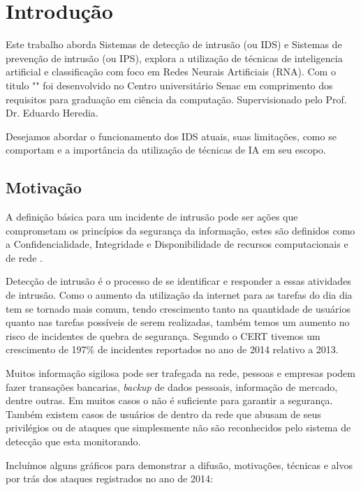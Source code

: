 
\chapter[Introdução]{Introdução}
Este trabalho aborda Sistemas de detecção de intrusão (\monoIDS ou IDS) e Sistemas de prevenção de intrusão (\monoIPS ou IPS), explora a utilização de técnicas de inteligencia artificial e classificação com foco em Redes Neurais Artificiais (RNA). Com o titulo "\monoTitulo"  foi desenvolvido no Centro universitário Senac em comprimento dos requisitos para graduação em ciência da computação. Supervisionado pelo Prof. Dr. Eduardo Heredia.

Desejamos abordar o funcionamento dos IDS atuais, suas limitações, como se comportam e a importância da utilização de técnicas de IA em seu escopo.
	
\section{Motivação}

A definição básica para um incidente de intrusão pode ser ações que comprometam os princípios da segurança da informação, estes são definidos como a Confidencialidade, Integridade e Disponibilidade de recursos computacionais e de rede \cite{whitman2011principles}. 

Detecção de intrusão é o processo de se identificar e responder a essas atividades de intrusão. Como o aumento da utilização da internet para  as tarefas do dia dia tem se tornado mais comum, tendo crescimento tanto na quantidade de usuários quanto nas tarefas possíveis de serem realizadas, também temos um aumento no risco de incidentes de quebra de segurança. Segundo o CERT \cite{CERT} tivemos um crescimento de 197\% de incidentes reportados no ano de 2014 relativo a 2013. 

Muitos informação sigilosa pode ser trafegada na rede, pessoas e empresas podem fazer transações bancarias, \textit{backup} de dados pessoais, informação de mercado, dentre outras. Em muitos casos o \monoFireWall não é suficiente para garantir a segurança. Também existem casos de usuários de dentro da rede que abusam de seus privilégios ou de ataques que simplesmente não são reconhecidos pelo sistema de detecção que esta monitorando.

Incluímos alguns gráficos para demonstrar a difusão, motivações, técnicas e alvos por trás dos ataques registrados no ano de 2014:



